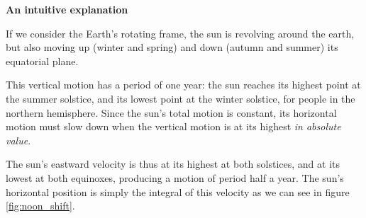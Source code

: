 \documentclass[12pt]{article}
\begin{document}
\textbf{An intuitive explanation}

If we consider the Earth's rotating frame,
the sun is revolving around the earth, but also moving up 
(winter and spring) and down (autumn and summer) its equatorial plane.

This vertical motion has a period of one year: the sun reaches its highest point
at the summer solstice, and its lowest point at the winter solstice, for people 
in the northern hemisphere. Since the sun's total motion is constant, its
horizontal motion must slow down when the vertical motion is at its highest 
\textit{in absolute value}. 

The sun's eastward velocity is thus at its highest
at both solstices, and at its lowest at both equinoxes, producing a
motion of period half a year. The sun's horizontal position is simply the
integral of this velocity as we can see in figure 
\ref{fig:noon_shift}.
\end{document}
